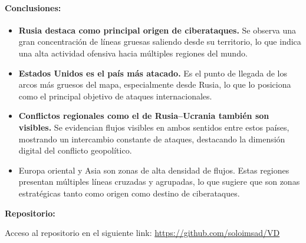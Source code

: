 \documentclass[12pt, a4paper]{article}
\begin{document}
\paragraph{Conclusiones:}
\begin{itemize}
    \item \textbf{Rusia destaca como principal origen de ciberataques.}
    Se observa una gran concentración de líneas gruesas saliendo desde su territorio, lo que indica una alta actividad ofensiva hacia múltiples regiones del mundo.
    \item \textbf{Estados Unidos es el país más atacado.}
    Es el punto de llegada de los arcos más gruesos del mapa, especialmente desde Rusia, lo que lo posiciona como el principal objetivo de ataques internacionales.
    \item \textbf{Conflictos regionales como el de Rusia–Ucrania también son visibles.}
    Se evidencian flujos visibles en ambos sentidos entre estos países, mostrando un intercambio constante de ataques, destacando la dimensión digital del conflicto geopolítico.
    \item {Europa oriental y Asia son zonas de alta densidad de flujos.}
    Estas regiones presentan múltiples líneas cruzadas y agrupadas, lo que sugiere que son zonas estratégicas tanto como origen como destino de ciberataques.

\end{itemize}


\textbf{Repositorio:}  
\label{anexo:repositorio}

Acceso al repositorio en el siguiente link:  
\url{https://github.com/soloimsad/VD}
\end{document}
